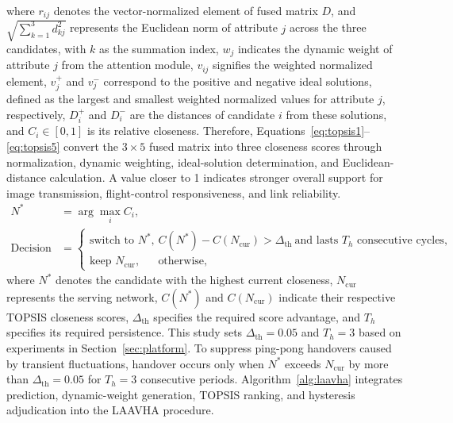 \documentclass[remotesensing,article,submit,moreauthors]{Definitions/mdpi}
\begin{document}
where $r_{ij}$ denotes the vector-normalized element of fused matrix $D$, and $\sqrt{\sum_{k=1}^{3}d_{kj}^{2}}$ represents the Euclidean norm of attribute $j$ across the three candidates, with $k$ as the summation index, $w_j$ indicates the dynamic weight of attribute $j$ from the attention module, $v_{ij}$ signifies the weighted normalized element, $v_j^+$ and $v_j^-$ correspond to the positive and negative ideal solutions, defined as the largest and smallest weighted normalized values for attribute $j$, respectively, $D_i^+$ and $D_i^-$ are the distances of candidate $i$ from these solutions, and $C_i\in[0,1]$ is its relative closeness. Therefore, Equations~\eqref{eq:topsis1}--\eqref{eq:topsis5} convert the $3\times5$ fused matrix into three closeness scores through normalization, dynamic weighting, ideal-solution determination, and Euclidean-distance calculation. A value closer to 1 indicates stronger overall support for image transmission, flight-control responsiveness, and link reliability.
\begin{align}
N^* &= \arg\max_i C_i, \label{eq:select}\\
\mathrm{Decision} &=
\begin{cases}
\text{switch to }N^*, & C(N^*)-C(N_{\mathrm{cur}})>\Delta_{\mathrm{th}}\ \text{and lasts }T_h\text{ consecutive cycles},\\
\text{keep }N_{\mathrm{cur}}, & \text{otherwise},
\end{cases} \label{eq:hysteresis}
\end{align}
where $N^*$ denotes the candidate with the highest current closeness, $N_{\mathrm{cur}}$ represents the serving network, $C(N^*)$ and $C(N_{\mathrm{cur}})$ indicate their respective TOPSIS closeness scores, $\Delta_{\mathrm{th}}$ specifies the required score advantage, and $T_h$ specifies its required persistence. This study sets $\Delta_{\mathrm{th}}=0.05$ and $T_h=3$ based on experiments in Section~\ref{sec:platform}. To suppress ping-pong handovers caused by transient fluctuations, handover occurs only when $N^*$ exceeds $N_{\mathrm{cur}}$ by more than $\Delta_{\mathrm{th}}=0.05$ for $T_h=3$ consecutive periods. Algorithm~\ref{alg:laavha} integrates prediction, dynamic-weight generation, TOPSIS ranking, and hysteresis adjudication into the LAAVHA procedure.
\end{document}
